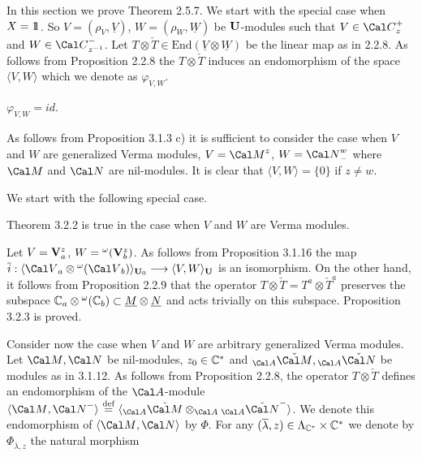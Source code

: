   In this section we prove Theorem 2.5.7.  We start with
the special case when $X = 1\!\!1$.  So  $V = (\rho_V, \underline{V})$,
$W = (\rho_W, \underline{W})$  be ${\bold U}$-modules such that  $V \in
{\Cal C}^+_z$ and  $W \in {\Cal C}^-_{z^{-1}}$.  Let  $T \otimes \check{T} \in
\text{End}(\underline{V}
\otimes \underline{W})$  be the linear map as in 2.2.8.  As follows from
Proposition 2.2.8 the  $T \otimes \check{T}$  induces an endomorphism of the
space  $\langle V,W\rangle$  which we denote as  $\varphi_{V,W}$.

  $\varphi_{V,W} = id$.
\endproclaim

  As follows from Proposition 3.1.3 c) it is
sufficient to consider the case when  $V$ and $W$ are generalized Verma
modules,
$V = {\Cal M}^z$, $W = {\Cal N}^w_-$  where ${\Cal M}$  and ${\Cal N}$  are
nil-modules.  It is clear that  $\langle V,W\rangle = \{ 0\}$  if $z \ne w$.
\enddemo

We start with the following special case.

  Theorem 3.2.2 is true in the
case when $V$ and $W$ are Verma modules.
\endproclaim

  Let  $V = {\bold V}^z_a$,
$W = {}^\omega ({\bold V}^z_b)$.  As follows from Proposition 3.1.16 the map
$\overline{i}:  \langle {\Cal V}_a \otimes
{}^\omega ({\Cal V}_b)\rangle_{{\bold U}_0} \longrightarrow
\langle V,W\rangle_{{\bold U}}$  is an isomorphism.  On the other hand,
it follows from Proposition 2.2.9 that the operator  $T \otimes \check{T}
= T^a \otimes \check{T}^a$  preserves the subspace
${\Bbb C}_a \otimes {}^\omega ({\Bbb C}_b) \subset \underline{M} \otimes
\underline{N}$ 	and acts trivially on this subspace.   Proposition 3.2.3 is
proved.
\enddemo

  Consider now the case when $V$ and $W$ are arbitrary
generalized  Verma modules.  Let
${\Cal M}, {\Cal N}$  be nil-modules, $z_0 \in {\Bbb C}^*$  and
${}_{\Cal A}\check{\Cal M}, {}_{\Cal A}\check{\Cal N}$  be modules as in
3.1.12.
As follows from Proposition 2.2.8, the
operator  $T \otimes \check{T}$ defines an endomorphism of the ${\Cal
A}$-module
$\langle {\Cal M}, {\Cal N}^-\rangle\ {\buildrel{\text{def}}\over =}\
\langle {}_{\Cal A}\check{\Cal M} \otimes_{\Cal A} {}_{\Cal A}\check{\Cal
N}^-\rangle$.  We denote
this endomorphism of  $\langle {\Cal M}, {\Cal N}\rangle$ by $\Phi$.  For any
$(\overline{\lambda},z) \in \Lambda_{{\Bbb C}^*} \times
{\Bbb C}^*$  we denote by  $\Phi_{\overline{\lambda},z}$  the natural
morphism

